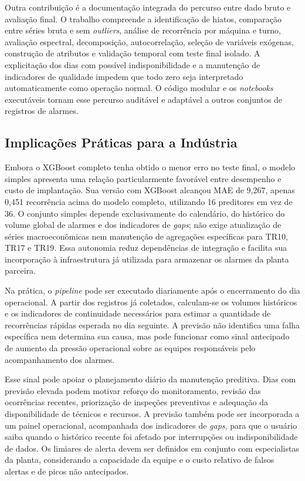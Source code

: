 Outra contribuição é a documentação integrada do percurso entre dado bruto e avaliação final. O trabalho compreende a identificação de hiatos, comparação entre séries bruta e sem \textit{outliers}, análise de recorrência por máquina e turno, avaliação espectral, decomposição, autocorrelação, seleção de variáveis exógenas, construção de atributos e validação temporal com teste final isolado. A explicitação dos dias com possível indisponibilidade e a manutenção de indicadores de qualidade impedem que todo zero seja interpretado automaticamente como operação normal. O código modular e os \textit{notebooks} executáveis tornam esse percurso auditável e adaptável a outros conjuntos de registros de alarmes.

\subsection{Implicações Práticas para a Indústria}

Embora o XGBoost completo tenha obtido o menor erro no teste final, o modelo simples apresenta uma relação particularmente favorável entre desempenho e custo de implantação. Sua versão com XGBoost alcançou MAE de 9,267, apenas 0,451 recorrência acima do modelo completo, utilizando 16 preditores em vez de 36. O conjunto simples depende exclusivamente do calendário, do histórico do volume global de alarmes e dos indicadores de \textit{gaps}; não exige atualização de séries macroeconômicas nem manutenção de agregações específicas para TR10, TR17 e TR19. Essa autonomia reduz dependências de integração e facilita sua incorporação à infraestrutura já utilizada para armazenar os alarmes da planta parceira.

Na prática, o \textit{pipeline} pode ser executado diariamente após o encerramento do dia operacional. A partir dos registros já coletados, calculam-se os volumes históricos e os indicadores de continuidade necessários para estimar a quantidade de recorrências rápidas esperada no dia seguinte. A previsão não identifica uma falha específica nem determina sua causa, mas pode funcionar como sinal antecipado de aumento da pressão operacional sobre as equipes responsáveis pelo acompanhamento dos alarmes.

Esse sinal pode apoiar o planejamento diário da manutenção preditiva. Dias com previsão elevada podem motivar reforço do monitoramento, revisão das ocorrências recentes, priorização de inspeções preventivas e adequação da disponibilidade de técnicos e recursos. A previsão também pode ser incorporada a um painel operacional, acompanhada dos indicadores de \textit{gaps}, para que o usuário saiba quando o histórico recente foi afetado por interrupções ou indisponibilidade de dados. Os limiares de alerta devem ser definidos em conjunto com especialistas da planta, considerando a capacidade da equipe e o custo relativo de falsos alertas e de picos não antecipados.

